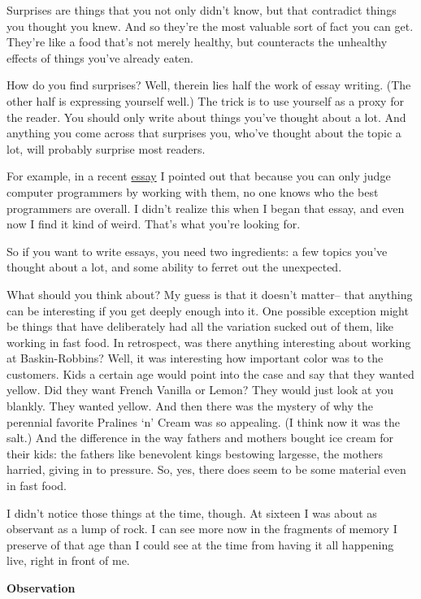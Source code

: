 Surprises are things that you not only didn't know, but that contradict
things you thought you knew. And so they're the most valuable sort of
fact you can get. They're like a food that's not merely healthy, but
counteracts the unhealthy effects of things you've already eaten.

How do you find surprises? Well, therein lies half the work of essay
writing. (The other half is expressing yourself well.) The trick is to
use yourself as a proxy for the reader. You should only write about
things you've thought about a lot. And anything you come across that
surprises you, who've thought about the topic a lot, will probably
surprise most readers.

For example, in a recent \href{gh.html}{essay} I pointed out that
because you can only judge computer programmers by working with them, no
one knows who the best programmers are overall. I didn't realize this
when I began that essay, and even now I find it kind of weird. That's
what you're looking for.

So if you want to write essays, you need two ingredients: a few topics
you've thought about a lot, and some ability to ferret out the
unexpected.

What should you think about? My guess is that it doesn't matter-- that
anything can be interesting if you get deeply enough into it. One
possible exception might be things that have deliberately had all the
variation sucked out of them, like working in fast food. In retrospect,
was there anything interesting about working at Baskin-Robbins? Well, it
was interesting how important color was to the customers. Kids a certain
age would point into the case and say that they wanted yellow. Did they
want French Vanilla or Lemon? They would just look at you blankly. They
wanted yellow. And then there was the mystery of why the perennial
favorite Pralines `n' Cream was so appealing. (I think now it was the
salt.) And the difference in the way fathers and mothers bought ice
cream for their kids: the fathers like benevolent kings bestowing
largesse, the mothers harried, giving in to pressure. So, yes, there
does seem to be some material even in fast food.

I didn't notice those things at the time, though. At sixteen I was about
as observant as a lump of rock. I can see more now in the fragments of
memory I preserve of that age than I could see at the time from having
it all happening live, right in front of me.

\textbf{Observation}

